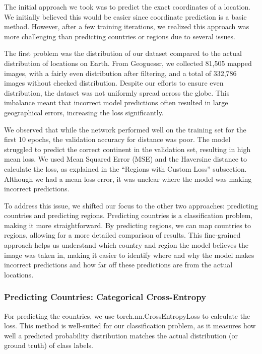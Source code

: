 \documentclass{article}
\begin{document}
The initial approach we took was to predict the exact coordinates of a
location. We initially believed this would be easier since coordinate
prediction is a basic method. However, after a few training iterations,
we realized this approach was more challenging than predicting countries
or regions due to several issues.

The first problem was the distribution of our dataset compared to the
actual distribution of locations on Earth. From Geoguessr, we collected
81,505 mapped images, with a fairly even distribution after filtering,
and a total of 332,786 images without checked distribution. Despite our
efforts to ensure even distribution, the dataset was not uniformly
spread across the globe. This imbalance meant that incorrect model
predictions often resulted in large geographical errors, increasing the
loss significantly.

We observed that while the network performed well on the training set
for the first 10 epochs, the validation accuracy for distance was poor.
The model struggled to predict the correct continent in the validation
set, resulting in high mean loss. We used Mean Squared Error (MSE) and
the Haversine distance to calculate the loss, as explained in the
``Regions with Custom Loss'' subsection. Although we had a mean loss
error, it was unclear where the model was making incorrect predictions.

To address this issue, we shifted our focus to the other two approaches:
predicting countries and predicting regions. Predicting countries is a
classification problem, making it more straightforward. By predicting
regions, we can map countries to regions, allowing for a more detailed
comparison of results. This fine-grained approach helps us understand
which country and region the model believes the image was taken in,
making it easier to identify where and why the model makes incorrect
predictions and how far off these predictions are from the actual
locations.

\subsubsection{Predicting Countries: Categorical
Cross-Entropy}\label{predicting-countries-categorical-cross-entropy}

For predicting the countries, we use torch.nn.CrossEntropyLoss to
calculate the loss. This method is well-suited for our classification
problem, as it measures how well a predicted probability distribution
matches the actual distribution (or ground truth) of class labels.
\end{document}
